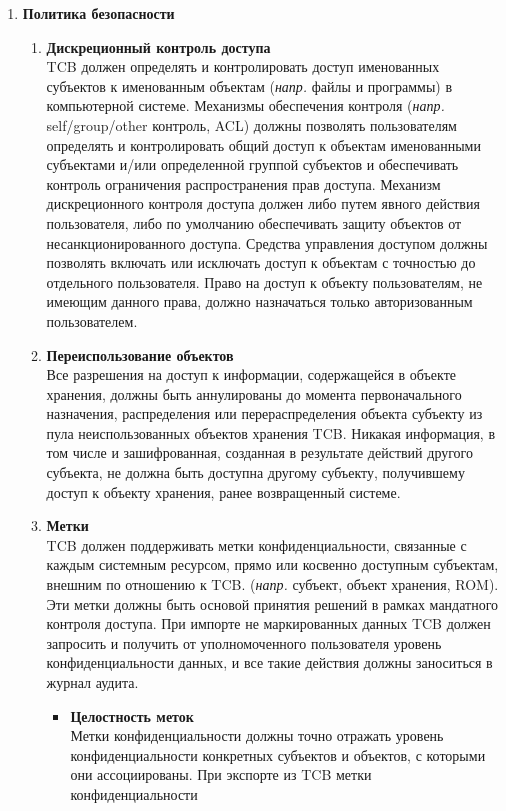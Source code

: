 \begin{enumerate}
\begin{enumerate}
		\begin{enumerate}
			\item{\textbf{Политика безопасности}}
			\begin{enumerate}
				\item{\textbf{Дискреционный контроль доступа}}\\
				TCB должен определять и контролировать доступ именованных субъектов к именованным объектам (\textit{напр.} файлы и программы) в компьютерной системе. Механизмы обеспечения контроля
				(\textit{напр.} self/group/other контроль, ACL) должны позволять пользователям определять и контролировать общий доступ к объектам именованными субъектами и/или определенной группой
				субъектов и обеспечивать контроль ограничения распространения прав доступа. Механизм дискреционного контроля доступа должен либо путем явного действия пользователя, либо по умолчанию
				обеспечивать защиту объектов от несанкционированного доступа. Средства управления доступом должны позволять включать или исключать доступ к объектам с точностью до отдельного
				пользователя. Право на доступ к объекту пользователям, не имеющим данного права, должно назначаться только авторизованным пользователем.
				\item{\textbf{Переиспользование объектов}}\\
				Все разрешения на доступ к информации, содержащейся в объекте хранения, должны быть аннулированы до момента первоначального назначения, распределения или перераспределения объекта
				субъекту из пула неиспользованных объектов хранения TCB. Никакая информация, в том числе и зашифрованная, созданная в результате действий другого субъекта, не должна быть доступна
				другому субъекту, получившему доступ к объекту хранения, ранее возвращенный системе.
				\item{\textbf{Метки}}\\
				TCB должен поддерживать метки конфиденциальности, связанные с каждым системным ресурсом, прямо или косвенно доступным субъектам, внешним по отношению к TCB. (\textit{напр.} субъект,
				объект хранения, ROM). Эти метки должны быть основой принятия решений в рамках мандатного контроля доступа. При импорте не маркированных данных TCB должен запросить и получить от
				уполномоченного пользователя уровень конфиденциальности данных, и все такие действия должны заноситься в журнал аудита.
				\begin{itemize}
					\item{\textbf{Целостность меток}}\\
					Метки конфиденциальности должны точно отражать уровень конфиденциальности конкретных субъектов и объектов, с которыми они ассоциированы. При экспорте из TCB метки конфиденциальности

\end{itemize}
\end{enumerate}
\end{enumerate}
\end{enumerate}
\end{enumerate}
